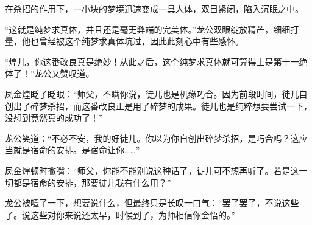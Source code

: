 \begin{this_body}
在杀招的作用下，一小块的梦境迅速变成一具人体，双目紧闭，陷入沉眠之中。

“这就是纯梦求真体，并且还是毫无弊端的完美体。”龙公双眼绽放精芒，细细打量，他也曾经被这个纯梦求真体坑过，因此此刻心中有些感怀。

“煌儿，你这番改良真是绝妙！从此之后，这个纯梦求真体就可算得上是第十一绝体了！”龙公又赞叹道。

凤金煌眨了眨眼：“师父，不瞒你说，徒儿也是机缘巧合。因为前段时间，徒儿自创出了碎梦杀招，而这番改良正是用了碎梦的成果。徒儿也是纯粹想要尝试一下，没想到竟然真的成功了！”

龙公笑道：“不必不安，我的好徒儿。你以为你自创出碎梦杀招，是巧合吗？这应当就是宿命的安排。是宿命让你……”

凤金煌顿时撇嘴：“师父，你能不能别说这种话了，徒儿可不想再听了。若是这一切都是宿命的安排，那要徒儿我有什么用？”

龙公被噎了一下，想要说什么，但最终只是长叹一口气：“罢了罢了，不说这些了。说这些对你来说还太早，时候到了，为师相信你会悟的。”

\end{this_body}

